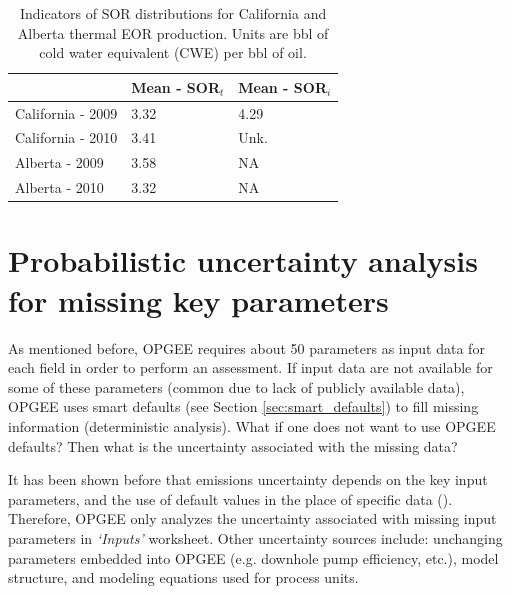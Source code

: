 \documentclass[11pt]{report}
\newcommand{\sheet}[1]{\textit{`{#1}'}}
\begin{document}
\begin{table}
\caption{Indicators of SOR distributions for California and Alberta thermal EOR production. Units are bbl of cold water equivalent (CWE) per bbl of oil.}
\label{tab:SOR_stats}
\begin{scriptsize}
\begin{tabularx}{1\columnwidth}{p{}p{}p{}}
\toprule
& Mean - SOR$_t$ & Mean - SOR$_i$ \\
\midrule
California - 2009 & 3.32 & 4.29 \\
California - 2010 & 3.41 & Unk. \\
Alberta - 2009 & 3.58 & NA \\
Alberta - 2010 & 3.32 & NA \\
\bottomrule
\end{tabularx}
\end{scriptsize}
\end{table}

\section{Probabilistic uncertainty analysis for missing key parameters}
\label{sec:Montecarlo}

As mentioned before, OPGEE requires about 50 parameters as input data for each field in order to perform an assessment. If input data are not available for some of these parameters (common due to lack of publicly available data), OPGEE uses smart defaults (see Section \ref{sec:smart_defaults}) to fill missing information (deterministic analysis). What if one does not want to use OPGEE defaults? Then what is the uncertainty associated with the missing data?

It has been shown before that emissions uncertainty depends on the key input parameters, and the use of default values in the place of specific data (\cite{brandt2014uncertainty,vafi2014uncertainty}). Therefore, OPGEE only analyzes the uncertainty associated with missing input parameters in \sheet{Inputs} worksheet. Other uncertainty sources include: unchanging parameters embedded into OPGEE (e.g. downhole pump efficiency, etc.), model structure, and modeling equations used for process units.
\end{document}
